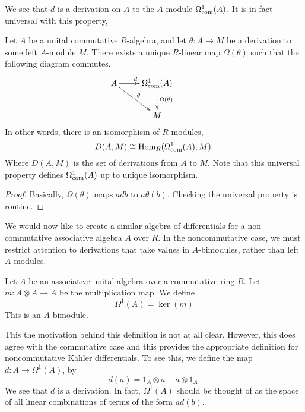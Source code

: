 We see that $d$ is a derivation on $A$ to the $A$-module $\Omega^1_{\operatorname{com}}(A)$.
It is in fact universal with this property,
\begin{theorem}
    Let $A$ be a unital commutative $R$-algebra, and let $\theta:A\rightarrow M$
    be a derivation to some left $A$-module $M$. There exists a unique $R$-linear 
    map $\Omega(\theta)$ such that the following diagram commutes,\\
    \begin{displaymath}
    \xymatrix{
        A \ar[r]^d \ar[rd]^\theta & 
        \Omega^1_{\com}(A) \ar@{.>}[d]^{\Omega(\theta)} &\\
         &
        M
    } 
  \end{displaymath}
  In other words, there is an isomorphism of $R$-modules,
  \begin{equation*}
    D(A,M) \cong \operatorname{Hom}_R(\Omega^1_{\operatorname{com}}(A),M).
  \end{equation*}
  Where $D(A,M)$ is the set of derivations from $A$ to $M$.
  Note that this universal property defines $\Omega^1_{\operatorname{com}}(A)$ up
  to unique isomorphism.
\end{theorem}
\begin{proof}
    Basically, $\Omega(\theta)$ maps $adb$ to $a\theta(b)$. Checking the universal property
    is routine.
\end{proof}

We would now like to create a similar algebra of differentials for a non-commutative
associative algebra $A$ over $R$. In the noncommutative case, we must restrict
attention to derivations that take values in $A$-bimodules, rather than left
$A$ modules.
\begin{definition}
    Let $A$ be an associative
    unital algebra over a commutative ring $R$. 
    Let $m:A\otimes A\rightarrow A$ be the multiplication map. We define
    \begin{equation*}
        \Omega^1(A) = \ker(m)
    \end{equation*}
    This is an $A$ bimodule.
\end{definition}
This the motivation behind this definition is not at all clear. However, this
does agree with the commutative case and this provides the appropriate definition
for noncommutative K\"ahler differentials. To see this, we define the map
$d:A\rightarrow \Omega^1(A)$, by
\begin{equation*}
    d(a) = 1_A\otimes a-a\otimes 1_A.
\end{equation*}
We see that $d$ is a derivation. In fact, $\Omega^1(A)$
should be thought of as the space of all linear combinations
of terms of the form $ad(b)$.


